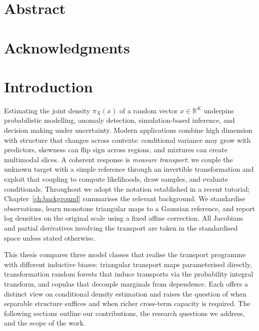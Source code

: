\documentclass[11pt,a4paper,twoside]{book}\usepackage[]{graphicx}\usepackage[]{xcolor}
\begin{document}





\graphicspath{{./figure/}}
\frontmatter
{}
\setcounter{tocdepth}{1}

\chapter*{Abstract}

\chapter*{Acknowledgments}

\tableofcontents
{}

\cleardoublepage
\mainmatter






\chapter{Introduction}\label{ch:intro}

Estimating the joint density $\pi_X(x)$ of a random vector $x \in \mathbb{R}^K$ underpins probabilistic modelling, anomaly detection, simulation-based inference, and decision making under uncertainty. Modern applications combine high dimension with structure that changes across contexts: conditional variance may grow with predictors, skewness can flip sign across regions, and mixtures can create multimodal slices. A coherent response is \emph{measure transport}: we couple the unknown target with a simple reference through an invertible transformation and exploit that coupling to compute likelihoods, draw samples, and evaluate conditionals. Throughout we adopt the notation established in a recent tutorial; Chapter~\ref{ch:background} summarises the relevant background. We standardise observations, learn monotone triangular maps to a Gaussian reference, and report log densities on the original scale using a fixed affine correction. All Jacobians and partial derivatives involving the transport are taken in the standardised space unless stated otherwise.

This thesis compares three model classes that realise the transport programme with different inductive biases: triangular transport maps parameterised directly, transformation random forests that induce transports via the probability integral transform, and copulas that decouple marginals from dependence. Each offers a distinct view on conditional density estimation and raises the question of when separable structure suffices and when richer cross-term capacity is required. The following sections outline our contributions, the research questions we address, and the scope of the work.
\end{document}

